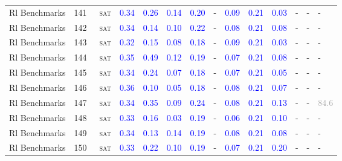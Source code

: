 \begin{center}
{\begin{longtable}{@{}llllllllllllll@{}}
Rl Benchmarks & 141 & ~\textsc{sat} & \textcolor{blue}{0.34} & \textcolor{blue}{0.26} & \textcolor{blue}{0.14} & \textcolor{blue}{0.20} & - & \textcolor{blue}{0.09} & \textcolor{blue}{0.21} & \textcolor{blue}{0.03} & - & - & - \\
Rl Benchmarks & 142 & ~\textsc{sat} & \textcolor{blue}{0.34} & \textcolor{blue}{0.14} & \textcolor{blue}{0.10} & \textcolor{blue}{0.22} & - & \textcolor{blue}{0.08} & \textcolor{blue}{0.21} & \textcolor{blue}{0.08} & - & - & - \\
Rl Benchmarks & 143 & ~\textsc{sat} & \textcolor{blue}{0.32} & \textcolor{blue}{0.15} & \textcolor{blue}{0.08} & \textcolor{blue}{0.18} & - & \textcolor{blue}{0.09} & \textcolor{blue}{0.21} & \textcolor{blue}{0.03} & - & - & - \\
Rl Benchmarks & 144 & ~\textsc{sat} & \textcolor{blue}{0.35} & \textcolor{blue}{0.49} & \textcolor{blue}{0.12} & \textcolor{blue}{0.19} & - & \textcolor{blue}{0.07} & \textcolor{blue}{0.21} & \textcolor{blue}{0.08} & - & - & - \\
Rl Benchmarks & 145 & ~\textsc{sat} & \textcolor{blue}{0.34} & \textcolor{blue}{0.24} & \textcolor{blue}{0.07} & \textcolor{blue}{0.18} & - & \textcolor{blue}{0.07} & \textcolor{blue}{0.21} & \textcolor{blue}{0.05} & - & - & - \\
Rl Benchmarks & 146 & ~\textsc{sat} & \textcolor{blue}{0.36} & \textcolor{blue}{0.10} & \textcolor{blue}{0.05} & \textcolor{blue}{0.18} & - & \textcolor{blue}{0.08} & \textcolor{blue}{0.21} & \textcolor{blue}{0.07} & - & - & - \\
Rl Benchmarks & 147 & ~\textsc{sat} & \textcolor{blue}{0.34} & \textcolor{blue}{0.35} & \textcolor{blue}{0.09} & \textcolor{blue}{0.24} & - & \textcolor{blue}{0.08} & \textcolor{blue}{0.21} & \textcolor{blue}{0.13} & - & - & \textcolor{darkgray}{84.6} \\
Rl Benchmarks & 148 & ~\textsc{sat} & \textcolor{blue}{0.33} & \textcolor{blue}{0.16} & \textcolor{blue}{0.03} & \textcolor{blue}{0.19} & - & \textcolor{blue}{0.06} & \textcolor{blue}{0.21} & \textcolor{blue}{0.10} & - & - & - \\
Rl Benchmarks & 149 & ~\textsc{sat} & \textcolor{blue}{0.34} & \textcolor{blue}{0.13} & \textcolor{blue}{0.14} & \textcolor{blue}{0.19} & - & \textcolor{blue}{0.08} & \textcolor{blue}{0.21} & \textcolor{blue}{0.08} & - & - & - \\
Rl Benchmarks & 150 & ~\textsc{sat} & \textcolor{blue}{0.33} & \textcolor{blue}{0.22} & \textcolor{blue}{0.10} & \textcolor{blue}{0.19} & - & \textcolor{blue}{0.07} & \textcolor{blue}{0.21} & \textcolor{blue}{0.20} & - & - & - \\

\end{longtable}}
\end{center}
